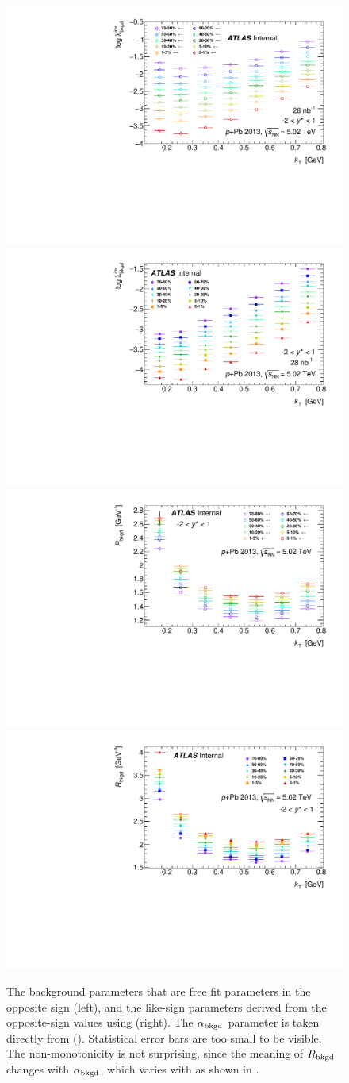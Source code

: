 \begin{figure}[t]
\begin{minipage}[t]{1.0\textwidth}
\centering
\includegraphics[width=.49\linewidth]{canqinv_backLambda_vs_kt_opp.pdf}
\includegraphics[width=.49\linewidth]{canqinv_backLambda_vs_kt_same.pdf}\\
\includegraphics[width=.49\linewidth]{canqinv_backR_vs_kt_opp.pdf}
\includegraphics[width=.49\linewidth]{canqinv_backR_vs_kt_same.pdf}\\
\end{minipage}
\caption{The background parameters that are free fit parameters in the opposite sign (left), and the like-sign parameters derived from the opposite-sign values using  (right). The $\alpha_{\mathrm{bkgd}}$ parameter is taken directly from \PYEight (). Statistical error bars are too small to be visible. The non-monotonicity is not surprising, since the meaning of $R_{\mathrm{bkgd}}$ changes with $\alpha_{\mathrm{bkgd}}$, which varies with \kt as shown in .}
\label{fig:background_data}
\end{figure}


